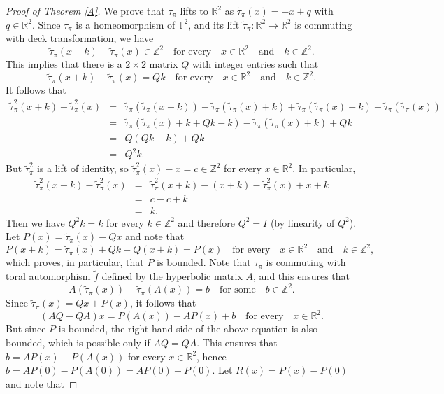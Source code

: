 \documentclass{amsart}
\theoremstyle{plain}
\theoremstyle{definition}
\newcommand{\Z}{\mathbb{Z}}
\newcommand{\R}{\mathbb{R}}
\begin{document}
\begin{proof}[Proof of Theorem \ref{A}]
We prove that $\tau_{\pi}$ lifts to $\R^2$ as $\tilde\tau_{\pi}(x)=-x+q$ with $q\in\R^2$. Since $\tau_{\pi}$ is a homeomorphism of $\mathbb{T}^2$, and its lift $\tilde \tau_{\pi}\colon\R^2\to\R^2$ is commuting with deck transformation,
 we have 
$$\tilde\tau_{\pi}(x+k)-\tilde\tau_{\pi}(x)\in \Z^2 \,\,\,\,\,\, \text{for every} \,\,\,\,\,\, x\in\R^2 \,\,\,\,\,\, \text{and}  \,\,\,\,\,\, k\in \Z^2.$$ This implies that there is a $2\times2$ matrix $Q$
with integer entries such that
$$\tilde\tau_{\pi}(x+k)-\tilde\tau_{\pi}(x)=Qk\,\,\,\,\,\, \text{for every} \,\,\,\,\,\, x\in\R^2 \,\,\,\,\,\, \text{and}  \,\,\,\,\,\, k\in \Z^2.$$
It follows that
\begin{eqnarray*}
\tilde\tau^2_{\pi}(x+k)-\tilde\tau^2_{\pi}(x)&=&
\tilde\tau_{\pi}(\tilde\tau_{\pi}(x+k))-\tilde\tau_{\pi}(\tilde\tau_{\pi}(x)+k)+\tilde\tau_{\pi}(\tilde\tau_{\pi}(x)+k)-\tilde\tau_{\pi}(\tilde\tau_{\pi}(x))\\
&=&\tilde\tau_{\pi}(\tilde\tau_{\pi}(x)+k+Qk-k)-\tilde\tau_{\pi}(\tilde\tau_{\pi}(x)+k)+Qk\\
&=&Q(Qk-k)+Qk\\
&=&Q^2 k.
\end{eqnarray*}
But $\tilde\tau_{\pi}^2$ is a lift of identity, so $\tilde\tau_{\pi}^2(x)-x=c\in \Z^2$ for every $x\in \R^2$. In particular,
\begin{eqnarray*}
\tilde\tau^2_{\pi}(x+k)-\tilde\tau^2_{\pi}(x)&=&
\tilde\tau^2_{\pi}(x+k)-(x+k)-\tilde\tau^2_{\pi}(x)+x+k\\
&=&c-c+k\\
&=&k.
\end{eqnarray*}
Then we have $Q^2k=k$ for every $k\in \Z^2$ and therefore $Q^2=I$ (by linearity of $Q^2$).
Let 
$P(x)=\tilde\tau_{\pi}(x)-Qx$ and note that
$$P(x+k)=\tilde\tau_{\pi}(x)+Qk-Q(x+k)=P(x) \,\,\,\,\,\, \text{for every} \,\,\,\,\,\, x\in\R^2 \,\,\,\,\,\, \text{and} \,\,\,\,\,\, k\in \Z^2,$$
which proves, in particular, that $P$ is bounded. 
Note that $\tau_{\pi}$ is commuting with toral automorphism $\tilde f$ defined by the hyperbolic matrix $A$, and this ensures that
$$A(\tilde\tau_{\pi}(x))-\tilde\tau_{\pi}(A(x))=b \,\,\,\,\,\, \text{for some} \,\,\,\,\,\, b\in \Z^2.$$
Since $\tilde\tau_{\pi}(x)=Qx+P(x)$, it follows that
$$(AQ-QA)x=P(A(x))-AP(x)+b \,\,\,\,\,\, \text{for every} \,\,\,\,\,\, x\in \R^2.$$
But since $P$ is bounded, the right hand side of the above equation is also bounded, 
which is possible only if $AQ=QA$. This ensures that $b=AP(x)-P(A(x))$ for every $x\in\R^2$, hence $b=AP(0)-P(A(0))=AP(0)-P(0)$. Let $R(x)=P(x)-P(0)$ and note that

\end{proof}
\end{document}
